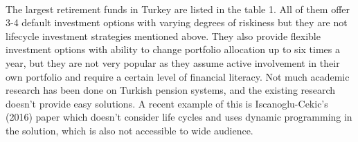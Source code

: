 \documentclass[review]{elsarticle}
\begin{document}
\paragraph*{}
The largest retirement funds in Turkey are listed in the table 1. All of them offer 3-4 default investment options with varying degrees of riskiness but they are not lifecycle investment strategies mentioned above. They also provide flexible investment options with ability to change portfolio allocation up to six times a year, but they are not very popular as they assume active involvement in their own portfolio and require a certain level of financial literacy. Not much academic research has been done on Turkish pension systems, and the existing research doesn't provide easy solutions. A recent example of this is Iscanoglu-Cekic's (2016) paper which doesn't consider life cycles and uses dynamic programming in the solution, which is also not accessible to wide audience.


\begin{thebibliography}{}
\end{thebibliography}
\end{document}
